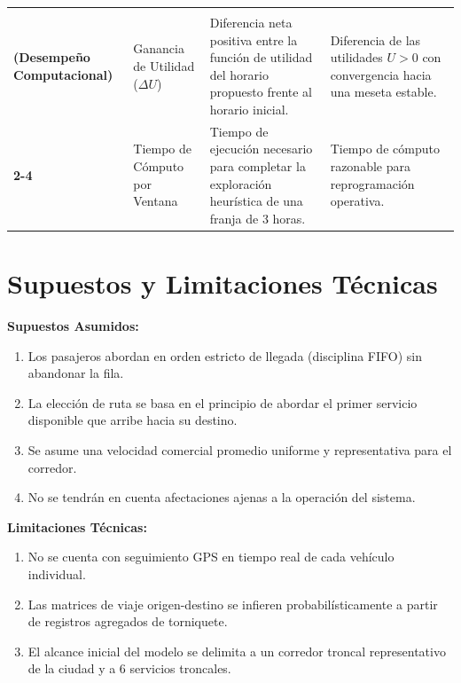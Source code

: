 \documentclass{article}
\begin{document}
\begin{longtable}{|>{\bfseries}p{} |p{} |p{} |p{}|}
    \multirow{2}{=}{\textbf{Métricas del Modelo de IA}\\
    \textbf{(Desempeño Computacional)}}
    &
    Ganancia de Utilidad
    (\(\Delta U\))
    &
    Diferencia neta positiva entre la función de utilidad del horario
    propuesto frente al horario inicial.
    &
    Diferencia de las utilidades \(U > 0\) con convergencia hacia
    una meseta estable.
    \\ \cline{2-4}

    &
    Tiempo de Cómputo por Ventana
    &
    Tiempo de ejecución necesario para completar la exploración
    heurística de una franja de 3 horas.
    &
    Tiempo de cómputo razonable para reprogramación operativa.
    \\

\end{longtable}





\section{Supuestos y Limitaciones Técnicas}

\textbf{Supuestos Asumidos:}

\begin{enumerate}
  \item Los pasajeros abordan en orden estricto de llegada (disciplina FIFO) sin abandonar la fila. 
  \item La elección de ruta se basa en el principio de abordar el primer servicio disponible que arribe hacia su destino. 
  \item Se asume una velocidad comercial promedio uniforme y representativa para el corredor.
  \item No se tendrán en cuenta afectaciones ajenas a la operación del sistema.
\end{enumerate}

\textbf{Limitaciones Técnicas: }

\begin{enumerate}
  \item No se cuenta con seguimiento GPS en tiempo real de cada vehículo individual.
  \item Las matrices de viaje origen-destino se infieren probabilísticamente a partir de registros agregados de torniquete.
  \item El alcance inicial del modelo se delimita a un corredor troncal representativo de la ciudad y a 6 servicios troncales.
\end{enumerate}
 



\printbibliography

\newpage

\thispagestyle{empty}

\vspace*{0.3\textwidth}

\begin{figure}[H]
  \centering
  
\end{figure}
\end{document}
